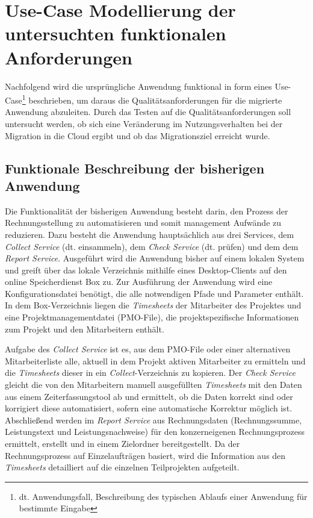 \section{Use-Case Modellierung der untersuchten funktionalen Anforderungen}
\label{sec:use-case-modellierung}

Nachfolgend wird die ursprüngliche Anwendung funktional in form eines Use-Case\footnote{dt. Anwendungsfall, Beschreibung des typischen Ablaufs einer Anwendung für bestimmte Eingabe} beschrieben, um daraus die Qualitätsanforderungen für die migrierte Anwendung abzuleiten. Durch das Testen auf die Qualitätsanforderungen soll untersucht werden, ob sich eine Veränderung im Nutzungsverhalten bei der Migration in die Cloud ergibt und ob das Migrationsziel erreicht wurde.

\subsection{Funktionale Beschreibung der bisherigen Anwendung}
Die Funktionalität der bisherigen Anwendung besteht darin, den Prozess der Rechnungsstellung zu automatisieren und somit management Aufwände zu reduzieren. Dazu besteht die Anwendung hauptsächlich aus drei Services, dem \textit{Collect Service} (dt. einsammeln), dem \textit{Check Service} (dt. prüfen) und dem dem \textit{Report Service}. Ausgeführt wird die Anwendung bisher auf einem lokalen System und greift über das lokale Verzeichnis mithilfe eines Desktop-Clients auf den online Speicherdienst \gls{Box} zu. Zur Ausführung der Anwendung wird eine Konfigurationsdatei benötigt, die alle notwendigen Pfade und Parameter enthält. In dem \gls{Box}-Verzeichnis liegen die \textit{\glspl{Timesheet}} der Mitarbeiter des Projektes und eine Projektmanagementdatei (PMO-File), die projektspezifische Informationen zum Projekt und den Mitarbeitern enthält.

Aufgabe des \textit{Collect Service} ist es, aus dem PMO-File oder einer alternativen Mitarbeiterliste alle, aktuell in dem Projekt aktiven Mitarbeiter zu ermitteln und die \textit{\glspl{Timesheet}} dieser in ein \textit{Collect}-Verzeichnis zu kopieren. Der \textit{Check Service} gleicht die von den Mitarbeitern manuell ausgefüllten \textit{\glspl{Timesheet}} mit den Daten aus einem Zeiterfassungstool ab und ermittelt, ob die Daten korrekt sind oder korrigiert diese automatisiert, sofern eine automatische Korrektur möglich ist. Abschließend werden im \textit{Report Service} aus Rechnungsdaten (Rechnungssumme, Leistungstext und Leistungsnachweise) für den konzerneigenen Rechnungsprozess ermittelt, erstellt und in einem Zielordner bereitgestellt. Da der Rechnungsprozess auf Einzelaufträgen basiert, wird die Information aus den \textit{\glspl{Timesheet}} detailliert auf die einzelnen Teilprojekten aufgeteilt.


